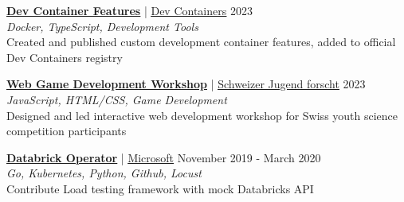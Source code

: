 \documentclass[margin, 10pt, hidelinks]{res} %
\newcommand{\tab}{\hspace*{1em}} %
\newcommand{\emphasize}{\bf} %
\begin{document}
\begin{resume}
    \href{https://github.com/devcontainers/devcontainers.github.io}{\emphasize\underline{Dev Container Features}} | \href{https://containers.dev/}{\underline{Dev Containers}} \hfill 2023 \\
    {\it Docker, TypeScript, Development Tools} \\
    \tab Created and published custom development container features, added to official Dev Containers registry

    \href{https://github.com/MS-SJF-Projects/web-game-complete}{\emphasize\underline{Web Game Development Workshop}} | \href{https://sjf.ch/}{\underline{Schweizer Jugend forscht}} \hfill 2023 \\
    {\it JavaScript, HTML/CSS, Game Development} \\
    \tab Designed and led interactive web development workshop for Swiss youth science competition participants

    \href{https://github.com/microsoft/azure-databricks-operator/pull/173}{\emphasize\underline{Databrick Operator}} | \href{https://www.microsoft.com/}{\underline{Microsoft}} \hfill November 2019  - March 2020 \\
    {\it Go, Kubernetes, Python, Github, Locust} \\
    \tab Contribute Load testing framework with mock Databricks API





\end{resume}
\end{document}
